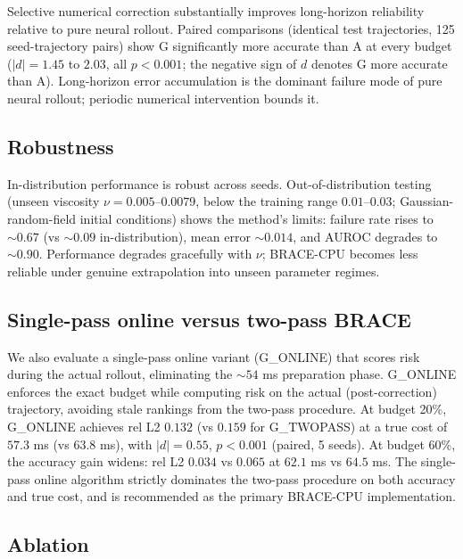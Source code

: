 \documentclass[11pt]{article}
\begin{document}
Selective numerical correction substantially improves long-horizon reliability
relative to pure neural rollout. Paired comparisons (identical test
trajectories, 125 seed-trajectory pairs) show G significantly more accurate
than A at every budget ($|d|=1.45$ to $2.03$, all $p<0.001$; the negative sign
of $d$ denotes G more accurate than A). Long-horizon error accumulation is the
dominant failure mode of pure neural rollout; periodic numerical intervention
bounds it.

\subsection{Robustness}
\label{sec:results-robustness}

In-distribution performance is robust across seeds. Out-of-distribution
testing (unseen viscosity $\nu=0.005$--$0.0079$, below the training range
$0.01$--$0.03$; Gaussian-random-field initial conditions) shows the method's
limits: failure rate rises to $\sim 0.67$ (vs $\sim 0.09$ in-distribution),
mean error $\sim 0.014$, and AUROC degrades to $\sim 0.90$. Performance
degrades gracefully with $\nu$; BRACE-CPU becomes less reliable under genuine
extrapolation into unseen parameter regimes.

\subsection{Single-pass online versus two-pass BRACE}
\label{sec:results-single-pass}

We also evaluate a single-pass online variant (G\_ONLINE) that scores risk during
the actual rollout, eliminating the $\sim 54$ ms preparation phase. G\_ONLINE
enforces the exact budget while computing risk on the actual (post-correction)
trajectory, avoiding stale rankings from the two-pass procedure. At budget 20\%,
G\_ONLINE achieves rel L2 $0.132$ (vs $0.159$ for G\_TWOPASS) at a true cost of
$57.3$ ms (vs $63.8$ ms), with $|d|=0.55$, $p<0.001$ (paired, 5 seeds). At budget
60\%, the accuracy gain widens: rel L2 $0.034$ vs $0.065$ at $62.1$ ms vs $64.5$ ms.
The single-pass online algorithm strictly dominates the two-pass procedure on both
accuracy and true cost, and is recommended as the primary BRACE-CPU implementation.

\subsection{Ablation}
\label{sec:ablation}
\end{document}
